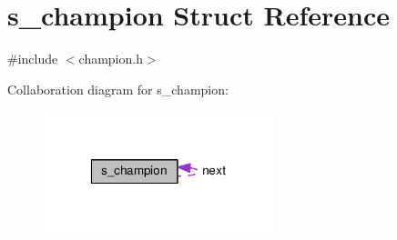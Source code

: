 \hypertarget{structs__champion}{\section{s\-\_\-champion Struct Reference}
\label{structs__champion}
}


{\ttfamily \#include $<$champion.\-h$>$}



Collaboration diagram for s\-\_\-champion\-:\nopagebreak
\begin{figure}[H]
\begin{center}
\leavevmode
\includegraphics[width=190pt]{de/d98/structs__champion__coll__graph}
\end{center}
\end{figure}
